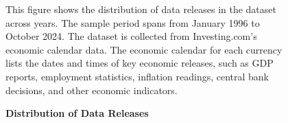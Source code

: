 \documentclass[12pt,oneside,letter]{article}
\begin{document}
\begin{landscape}
	
	\begin{figure}

	    \begin{center}
	    	\caption{\bf Distribution of Data Releases}
		    \medskip
		     \label{fig:LookAheadBias:economic events per year}
	    \end{center}
	
	
	    \begin{small}
	    This figure shows the distribution of data releases in the dataset across years. The sample period spans from January 1996 to October 2024. The dataset is collected from Investing.com’s economic calendar data. The economic calendar for each currency lists the dates and times of key economic releases, such as GDP reports, employment statistics, inflation readings, central bank decisions, and other economic indicators.
	    \end{small}


	\end{figure}

\end{landscape}
\end{document}
